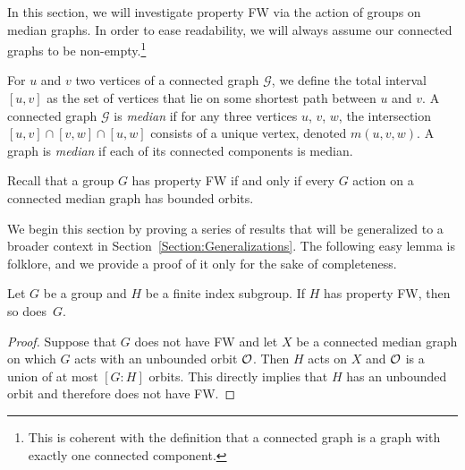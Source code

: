 \label{Section:Median}
In this section, we will investigate property FW via the action of groups on median graphs.
In order to ease readability, we will always assume our connected graphs to be non-empty.\footnote{This is coherent with the definition that a connected graph is a graph with exactly one connected component.}

For $u$ and $v$ two vertices of a connected graph $\mathcal G$, we define the total interval $[u,v]$ as the set of vertices that lie on some shortest path between $u$ and $v$.
A connected graph $\mathcal G$ is \emph{median} if for any three vertices $u$, $v$, $w$, the intersection $[u,v]\cap[v,w]\cap[u,w]$ consists of a unique vertex, denoted $m(u,v,w)$.
A graph is \emph{median} if each of its connected components is median.

Recall that a group $G$ has property FW if and only if every $G$ action on a connected median graph has bounded orbits.


We begin this section by proving a series of results that will be generalized to a broader context in Section~\ref{Section:Generalizations}.
The following easy lemma is folklore, and we provide a proof of it only for the sake of completeness.
\begin{lem}\label{Lemma:Subgroup}
Let $G$ be a group and $H$ be a finite index subgroup.
If $H$ has property FW, then so does~$G$.
\end{lem}
\begin{proof}
Suppose that $G$ does not have FW and let $X$ be a connected median graph on which $G$ acts with an unbounded orbit $\mathcal O$.
Then $H$ acts on $X$ and $\mathcal O$ is a union of at most $[G:H]$ orbits. This directly implies that $H$ has an unbounded orbit and therefore does not have FW.
\end{proof}

